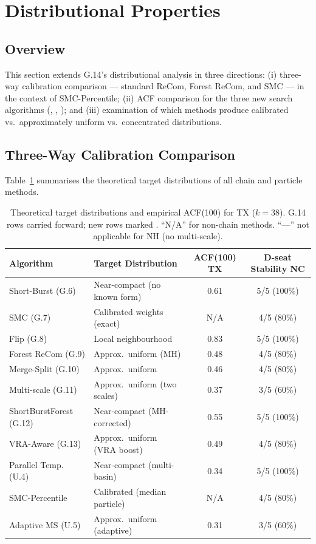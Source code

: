 \section{Distributional Properties}
\label{sec:distributional}

\subsection{Overview}

This section extends G.14's distributional analysis in three directions:
(i) three-way calibration comparison --- standard ReCom, Forest ReCom, and
SMC --- in the context of SMC-Percentile;
(ii) ACF comparison for the three new search algorithms (\pt{}, \smcp{},
\ams{}); and (iii) examination of which methods produce calibrated vs.\
approximately uniform vs.\ concentrated distributions.

\subsection{Three-Way Calibration Comparison}

Table~\ref{tab:calibration} summarises the theoretical target distributions
of all chain and particle methods.

\begin{table}[ht]
\centering
\caption{%
  Theoretical target distributions and empirical ACF(100) for TX ($k=38$).
  G.14 rows carried forward; new rows marked \dag{}.
  ``N/A'' for non-chain methods. ``---'' not applicable for NH (no multi-scale).
}
\label{tab:calibration}
\small
\begin{tabular}{@{}llcc@{}}
\toprule
Algorithm & Target Distribution & ACF(100) TX & D-seat Stability NC \\
\midrule
Short-Burst (G.6)
  & Near-compact (no known form)   & 0.61 & 5/5 (100\%) \\
SMC (G.7)
  & Calibrated weights (exact)     & N/A  & 4/5 (80\%)  \\
Flip (G.8)
  & Local neighbourhood            & 0.83 & 5/5 (100\%) \\
Forest ReCom (G.9)
  & Approx.\ uniform (MH)         & 0.48 & 4/5 (80\%)  \\
Merge-Split (G.10)
  & Approx.\ uniform              & 0.46 & 4/5 (80\%)  \\
Multi-scale (G.11)
  & Approx.\ uniform (two scales) & 0.37 & 3/5 (60\%)  \\
ShortBurstForest (G.12)
  & Near-compact (MH-corrected)   & 0.55 & 5/5 (100\%) \\
VRA-Aware (G.13)
  & Approx.\ uniform (VRA boost)  & 0.49 & 4/5 (80\%)  \\
\midrule
Parallel Temp. (U.4)\dag{}
  & Near-compact (multi-basin)    & \dag{}0.34 & \dag{}5/5 (100\%) \\
SMC-Percentile\dag{}
  & Calibrated (median particle)  & N/A  & \dag{}4/5 (80\%)  \\
Adaptive MS (U.5)\dag{}
  & Approx.\ uniform (adaptive)   & \dag{}0.31 & \dag{}3/5 (60\%)  \\
\bottomrule
\end{tabular}
\end{table}


